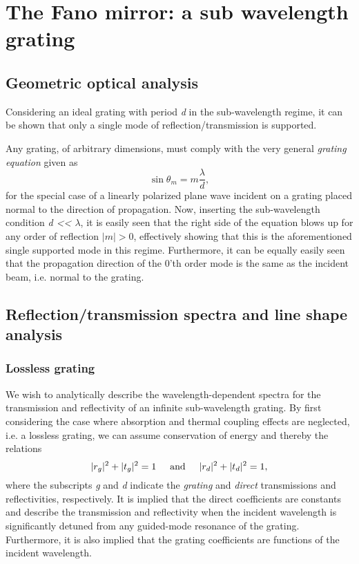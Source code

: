 \section{The Fano mirror: a sub wavelength grating}

\subsection{Geometric optical analysis}

Considering an ideal grating with period \emph{d} in the sub-wavelength regime, it can be shown that only a single mode of reflection/transmission is supported. 

Any grating, of arbitrary dimensions, must comply with the very general \emph{grating equation}\cite{Pedrotti} given as
\begin{equation}
    \sin \theta_m = m \frac{\lambda}{d},
\end{equation}
for the special case of a linearly polarized plane wave incident on a grating placed normal to the direction of propagation. Now, inserting the sub-wavelength condition \emph{d << $\lambda$}, it is easily seen that the right side of the equation blows up for any order of reflection $|m| > 0$, effectively showing that this is the aforementioned single supported mode in this regime. Furthermore, it can be equally easily seen that the propagation direction of the 0'th order mode is the same as the incident beam, i.e. normal to the grating.

\subsection{Reflection/transmission spectra and line shape analysis}

\subsubsection{Lossless grating}

We wish to analytically describe the wavelength-dependent spectra for the transmission and reflectivity of an infinite sub-wavelength grating. By first considering the case where absorption and thermal coupling effects are neglected, i.e. a lossless grating, we can assume conservation of energy and thereby the relations
\begin{equation}
    |r_g|^2+|t_g|^2=1 \hspace{0.5cm} \text{and} \hspace{0.5cm} |r_d|^2+|t_d|^2=1,
    \label{eq:energy conservation}
\end{equation}
where the subscripts \emph{g} and \emph{d} indicate the \emph{grating} and \emph{direct} transmissions and reflectivities, respectively. It is implied that the direct coefficients are constants and describe the transmission and reflectivity when the incident wavelength is significantly detuned from any guided-mode resonance of the grating. Furthermore, it is also implied that the grating coefficients are functions of the incident wavelength.

